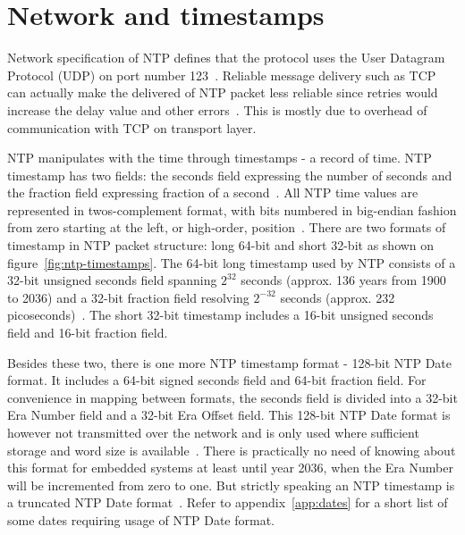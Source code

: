 
\section{Network and timestamps}\label{sec:ntp-network}
Network specification of NTP defines that
the protocol uses the User Datagram Protocol (UDP) on port number 123~\cite{ianna-ports,rfc5905}.
Reliable message delivery such as TCP can actually make the delivered of
NTP packet less reliable since retries
would increase the delay value and other errors~\cite{rfc5905}.
This is mostly due to overhead of communication with TCP on transport layer.

NTP manipulates with the time through timestamps - a record of time.
NTP timestamp has two fields: the seconds field expressing the number of seconds
and the fraction field expressing fraction of a second~\cite{rfc5905}.
All NTP time values are represented in twos-complement format, with
bits numbered in big-endian fashion from zero starting at the left, or high-order, position~\cite{rfc5905}. 
There are two formats of timestamp in NTP packet structure:
long 64-bit and short 32-bit as shown on figure~\ref{fig:ntp-timestamps}.
The 64-bit long timestamp used by NTP consists of a 32-bit unsigned seconds
field spanning $2^{32}$ seconds (approx. 136 years from 1900 to 2036) and a 32-bit fraction field resolving
$2^{-32}$ seconds (approx. 232 picoseconds)~\cite{rfc5905}.
The short 32-bit timestamp includes a 16-bit unsigned seconds field
and 16-bit fraction field.

Besides these two, there is one more NTP timestamp format - 128-bit NTP Date format.
It includes a 64-bit signed seconds field and 64-bit fraction field.
For convenience in mapping between formats,
the seconds field is divided into a 32-bit Era Number field
and a 32-bit Era Offset field.
This 128-bit NTP Date format is however not transmitted over the network
and is only used where sufficient storage and word size is available~\cite{rfc5905}.
There is practically no need of knowing about this format for embedded systems
at least until year 2036, when the Era Number will be incremented from zero to one.
But strictly speaking an NTP timestamp is a truncated NTP Date format~\cite{rfc5905}.
Refer to appendix~\ref{app:dates} for a short list of some dates
requiring usage of NTP Date format.

